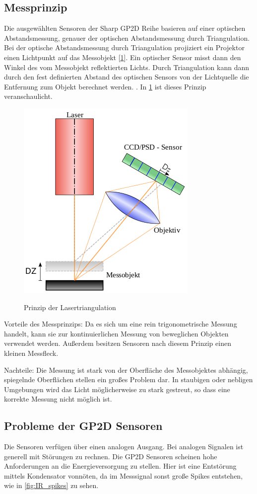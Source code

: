 \subsection{Messprinzip}
Die ausgewählten Sensoren der Sharp GP2D Reihe basieren auf einer optischen Abstandsmessung, genauer der optischen Abstandsmessung durch Triangulation.
Bei der optische Abstandsmessung durch Triangulation projiziert ein Projektor einen Lichtpunkt auf das Messobjekt [\ref{fig:lasertriangulation}]. Ein optischer
Sensor misst dann den Winkel des vom Messobjekt reflektierten Lichts. Durch Triangulation kann dann durch den fest definierten Abstand des optischen
Sensors von der Lichtquelle die Entfernung zum Objekt berechnet werden. \cite{Hugenschmidt2007}. In \cref{fig:lasertriangulation} ist
dieses Prinzip veranschaulicht.
\begin{figure}[H]
\centering
\includegraphics[width=.5\textwidth]{lasertriangulation.png}\\
\caption{Prinzip der Lasertriangulation \cite{lasertriangulation}}%
\label{fig:lasertriangulation}
\end{figure}

Vorteile des Messprinzips:
Da es sich um eine rein trigonometrische Messung handelt, kann sie zur kontinuierlichen Messung von beweglichen Objekten verwendet werden.
Außerdem besitzen Sensoren nach diesem Prinzip einen kleinen Messfleck.

Nachteile:
Die Messung ist stark von der Oberfläche des Messobjektes abhängig, spiegelnde Oberflächen stellen ein großes Problem dar.
In staubigen oder nebligen Umgebungen wird das Licht möglicherweise zu stark gestreut, so dass eine korrekte Messung nicht möglich ist.

\subsection{Probleme der GP2D Sensoren}
Die Sensoren verfügen über einen analogen Ausgang. Bei analogen Signalen ist generell mit Störungen zu rechnen. Die GP2D Sensoren scheinen
hohe Anforderungen an die Energieversorgung zu stellen. Hier ist eine Entstörung mittels Kondensator vonnöten, da im Messsignal sonst große Spikes
entstehen, wie in \cref{fig:IR_spikes} zu sehen.

